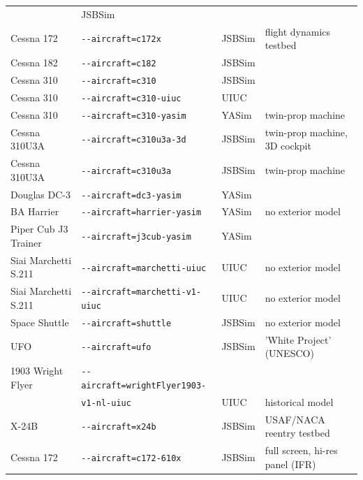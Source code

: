 {\begin{tabular}{l|l|l|l}
   & JSBSim &           \\
   Cessna 172 & 	\texttt{-$ $-aircraft=c172x}                       
   & JSBSim & flight dynamics testbed          \\
   Cessna 182					&		\texttt{-$ $-aircraft=c182}                        
   & JSBSim &           \\
   Cessna 310					&		\texttt{-$ $-aircraft=c310}                        
   & JSBSim &           \\
   Cessna 310					&		\texttt{-$ $-aircraft=c310-uiuc}                   
   &  UIUC &           \\
   Cessna 310					&		\texttt{-$ $-aircraft=c310-yasim}                  
   &  YASim &  twin-prop machine         \\
   Cessna 310U3A &		\texttt{-$ $-aircraft=c310u3a-3d}                  
   & JSBSim &  twin-prop machine, 3D cockpit         \\
   Cessna 310U3A			&		\texttt{-$ $-aircraft=c310u3a}                     
   & JSBSim &  twin-prop machine         \\
   Douglas DC-3	  		&		\texttt{-$ $-aircraft=dc3-yasim}                   
   &  YASim &           \\
   BA Harrier	&		\texttt{-$ $-aircraft=harrier-yasim}               
   &  YASim & no exterior model         \\
   Piper Cub J3 Trainer				&		\texttt{-$ $-aircraft=j3cub-yasim}                 
   &  YASim &           \\
   Siai Marchetti S.211				&		\texttt{-$ $-aircraft=marchetti-uiuc}              
   &  UIUC & no exterior model          \\
   Siai Marchetti S.211			&		\texttt{-$ $-aircraft=marchetti-v1-uiuc}           
   &  UIUC & no exterior model          \\
   Space Shuttle					&		\texttt{-$ $-aircraft=shuttle}                     
   & JSBSim & no exterior model          \\
   UFO 	&		\texttt{-$ $-aircraft=ufo}               
   & JSBSim & 'White Project' (UNESCO)            \\
   1903 Wright Flyer					&		\texttt{-$ $-aircraft=wrightFlyer1903-}  
   & &          \\
   					&		\texttt{v1-nl-uiuc}  
   & UIUC & historical model          \\
      X-24B	&		\texttt{-$ $-aircraft=x24b}                        
   & JSBSim & USAF/NACA reentry testbed          \\
   Cessna 172  &	\texttt{-$ $-aircraft=c172-610x}         
   & JSBSim & full screen, hi-res panel (IFR)          \\
\end{tabular}
}

